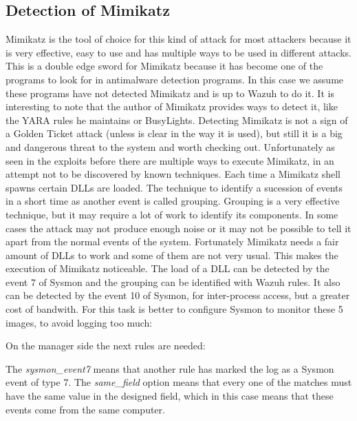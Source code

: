 \subsection{Detection of Mimikatz}
Mimikatz is the tool of choice for this kind of attack for most attackers because it is very effective, easy to use and has multiple ways to be used in different attacks\cite{mimikatz_github}\cite{mimikatz_details}. This is a double edge sword for Mimikatz because it has become one of the programs to look for in antimalware detection programs. In this case we assume these programs have not detected Mimikatz and is up to Wazuh to do it. It is interesting to note that the author of Mimikatz provides ways to detect it, like the YARA rules he maintains\cite{mimikatz_github} or BusyLights\cite{understanding_powersploit_mimikatz}.
\linej
\linej
Detecting Mimikatz is not a sign of a Golden Ticket attack (unless is clear in the way it is used), but still it is a big and dangerous threat to the system and worth checking out.
\linej
Unfortunately as seen in the exploits before there are multiple ways to execute Mimikatz, in an attempt not to be discovered by known techniques.
\linej
\linej
Each time a Mimikatz shell spawns certain DLLs are loaded. The technique to identify a sucession of events in a short time as another event is called grouping.
Grouping is a very effective technique, but it may require a lot of work to identify its components. In some cases the attack may not produce enough noise or it may not be possible to tell it apart from the normal events of the system\cite{sysmon}\cite{sysmon_event_7_mimikatz}.
\linej
Fortunately Mimikatz needs a fair amount of DLLs to work and some of them are not very usual. This makes the execution of Mimikatz noticeable.
\linej
\linej
 The load of a DLL can be detected by the event 7 of Sysmon and the grouping can be identified with Wazuh rules. It also can be detected by the event 10 of Sysmon, for inter-process access, but a greater cost of bandwith.
For this task is better to configure Sysmon to monitor these 5 images, to avoid logging too much:
\linej

\linej
On the manager side the next rules are needed:
\linej

The \textit{sysmon\_event7} means that another rule has marked the log as a Sysmon event of type 7.
\linej
The \textit{same\_field} option means that every one of the matches must have the same value in the designed field, which in this case means that these events come from the same computer.
